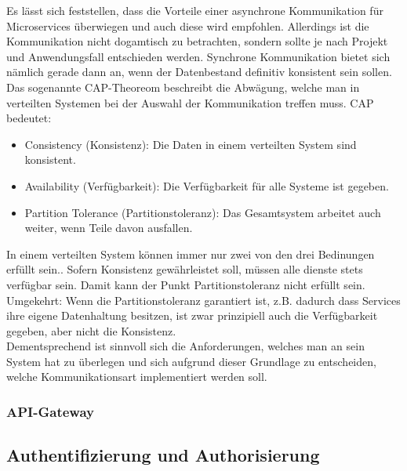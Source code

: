 Es lässt sich feststellen, dass die Vorteile einer asynchrone Kommunikation für Microservices überwiegen und auch diese wird empfohlen.\cite{wolff2018mic_praxis}\cite{bruce2019mic_in_action} Allerdings ist die Kommunikation nicht dogamtisch zu betrachten, sondern sollte je nach Projekt und Anwendungsfall entschieden werden. Synchrone Kommunikation bietet sich nämlich gerade dann an, wenn der Datenbestand definitiv konsistent sein sollen. \\

Das sogenannte CAP-Theoreom beschreibt die Abwägung, welche man in verteilten Systemen bei der Auswahl der Kommunikation treffen muss. CAP bedeutet:
	\begin{itemize}
		\item Consistency (Konsistenz): Die Daten in einem verteilten System sind konsistent.
		\item Availability (Verfügbarkeit): Die Verfügbarkeit für alle Systeme ist gegeben. 
		\item Partition Tolerance (Partitionstoleranz): Das Gesamtsystem arbeitet auch weiter, wenn Teile davon ausfallen. 
	\end{itemize}  

In einem verteilten System können immer nur zwei von den drei Bedinungen erfüllt sein.\cite{wolff2018mic_praxis}. Sofern Konsistenz gewährleistet soll, müssen alle dienste stets verfügbar sein. Damit kann der Punkt Partitionstoleranz nicht erfüllt sein. Umgekehrt: Wenn die Partitionstoleranz garantiert ist, z.B. dadurch dass Services ihre eigene Datenhaltung besitzen, ist zwar prinzipiell auch die Verfügbarkeit gegeben, aber nicht die Konsistenz. \\

Dementsprechend ist sinnvoll sich die Anforderungen, welches man an sein System hat zu überlegen und sich aufgrund dieser Grundlage zu entscheiden, welche Kommunikationsart implementiert werden soll. 

\subsubsection{API-Gateway}


\subsection{Authentifizierung und Authorisierung}





